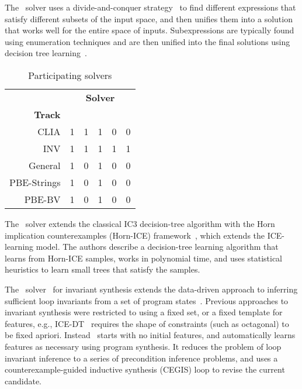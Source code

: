 The \eusolvernew\ solver uses a divide-and-conquer strategy~\cite{AlurCAV15} to find different expressions that satisfy different subsets of the input space,
and then unifies them into a solution that works well for the entire space of inputs.
Subexpressions are typically found using enumeration techniques
and are then unified into the final solutions using decision tree learning~\cite{AlurRU17}.

\begin{wraptable}{r}{5cm}
	\setlength{\tabcolsep}{4pt}
	\def\arraystretch{1.2}
	\begin{center}
		\begin{tabular}{r||rrrrr}
			& \multicolumn{5}{c}{\textbf{Solver}} \\[8pt]
			\textbf{Track} & \rot{\cvcnew} & \rot{\dryd} & \rot{\eusolvernew} & \rot{\horndini} & \rot{\lig} \\ \hline \hline
			CLIA        & 1 & 1 & 1 & 0 & 0 \\
			INV         & 1 & 1 & 1 & 1 & 1 \\
			General     & 1 & 0 & 1 & 0 & 0 \\ 
			PBE-Strings & 1 & 0 & 1 & 0 & 0 \\ 
			PBE-BV      & 1 & 0 & 1 & 0 & 0 \\
		\end{tabular}
	\end{center}
	\captionsetup{skip=0em}
	\caption{Participating solvers}
	\label{tbl:solvers-in-tracks}
\end{wraptable}

The \horndini\ solver extends the classical IC3 decision-tree algorithm with
the Horn implication counterexamples (Horn-ICE) framework~\cite{EzudheenND0M18},
which extends the ICE-learning model.
The authors describe a decision-tree learning algorithm that learns from Horn-ICE samples,
works in polynomial time, and uses statistical heuristics to learn small trees that satisfy the samples.

The \lig\ solver~\cite{PadhiM17} for invariant synthesis extends the data-driven approach to inferring sufficient loop invariants
from a set of program states~\cite{PadhiSM16}.
Previous approaches to invariant synthesis were restricted to using a fixed set, or a fixed template for features,
e.g., ICE-DT~\cite{GNMR16} requires the shape of constraints (such as octagonal) to be fixed apriori.
Instead \lig\ starts with no initial features, and automatically learns features as necessary using program synthesis.
It reduces the problem of loop invariant inference to a series of precondition inference problems,
and uses a counterexample-guided inductive synthesis (CEGIS) loop to revise the current candidate.
